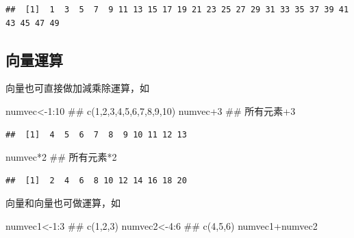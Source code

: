 \documentclass[]{book}
\newenvironment{Shaded}{\begin{snugshade}}{\end{snugshade}}
\newcommand{\KeywordTok}[1]{\textcolor[rgb]{0.13,0.29,0.53}{\textbf{{#1}}}}
\newcommand{\DataTypeTok}[1]{\textcolor[rgb]{0.13,0.29,0.53}{{#1}}}
\newcommand{\DecValTok}[1]{\textcolor[rgb]{0.00,0.00,0.81}{{#1}}}
\newcommand{\NormalTok}[1]{{#1}}
\theoremstyle{definition}
\theoremstyle{definition}
\theoremstyle{remark}
\begin{document}
\begin{Shaded}
\end{Shaded}

\begin{verbatim}
##  [1]  1  3  5  7  9 11 13 15 17 19 21 23 25 27 29 31 33 35 37 39 41 43 45 47 49
\end{verbatim}

\subsection{向量運算}

向量也可直接做加減乘除運算，如

\begin{Shaded}
\begin{Highlighting}[]
\NormalTok{numvec<-}\DecValTok{1}\NormalTok{:}\DecValTok{10} \NormalTok{## c(1,2,3,4,5,6,7,8,9,10)}
\NormalTok{numvec}\DecValTok{+3} \NormalTok{## 所有元素+3}
\end{Highlighting}
\end{Shaded}

\begin{verbatim}
##  [1]  4  5  6  7  8  9 10 11 12 13
\end{verbatim}

\begin{Shaded}
\begin{Highlighting}[]
\NormalTok{numvec*}\DecValTok{2} \NormalTok{## 所有元素*2}
\end{Highlighting}
\end{Shaded}

\begin{verbatim}
##  [1]  2  4  6  8 10 12 14 16 18 20
\end{verbatim}

向量和向量也可做運算，如

\begin{Shaded}
\begin{Highlighting}[]
\NormalTok{numvec1<-}\DecValTok{1}\NormalTok{:}\DecValTok{3} \NormalTok{## c(1,2,3)}
\NormalTok{numvec2<-}\DecValTok{4}\NormalTok{:}\DecValTok{6} \NormalTok{## c(4,5,6)}
\NormalTok{numvec1+numvec2}
\end{Highlighting}
\end{Shaded}
\end{document}
